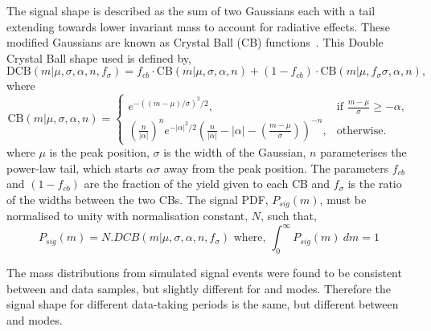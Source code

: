 The signal shape is described as the sum of two Gaussians each with a tail extending towards lower invariant mass to account for radiative effects. These modified Gaussians are known as Crystal Ball (CB) functions~\cite{Skwarnicki:1986xj}. This Double Crystal Ball shape used is defined by,
\begin{equation}
\mathrm{DCB}(m| \mu,\sigma,\alpha,n,f_{\sigma}) = f_{cb} \cdot \mathrm{CB}(m| \mu,\sigma,\alpha,n) + (1-f_{cb}) \cdot \mathrm{CB}(m|\mu,f_{\sigma}\sigma,\alpha,n),
\label{DCBshape}
\end{equation}
where
\begin{equation*}
  \mathrm{CB}(m| \mu,\sigma,\alpha,n)=
\begin{cases}
    e^{-((m-\mu)/ \sigma)^2/2},                                   & \text{if } \frac{m-\mu}{\sigma} \geq - \alpha, \\
   \left ( \frac{n}{|\alpha|} \right ) ^n e^{-|\alpha|^2/2} \left ( \frac{n}{|\alpha|} - |\alpha| - \left ( \frac{m-\mu}{\sigma} \right ) \right ) ^{-n} ,    & \text{otherwise.}
\end{cases}
\end{equation*}
where $\mu$ is the peak position, $\sigma$ is the width of the Gaussian, $n$ parameterises the power-law tail, which starts $\alpha\sigma$ away from the peak position. The parameters $f_{cb}$ and $(1-f_{cb})$ are the fraction of the yield given to each CB and $f_{\sigma}$ is the ratio of the widths between the two CBs. The signal PDF, $P_{sig}(m)$, must be normalised to unity with normalisation constant, $N$, such that,
\begin{equation}
P_{sig}(m) = N . DCB(m| \mu,\sigma,\alpha,n,f_{\sigma}) \text{	where, } \int_{0}^{\infty} P_{sig}(m)\ dm = 1
\end{equation}

The \Bm mass distributions from simulated signal events were found to be consistent between \runone and \runtwo data samples, but slightly different for \kpi and \kpipipi modes. Therefore the signal shape for different data-taking periods is the same, but different between \kpi and \kpipipi modes. 

